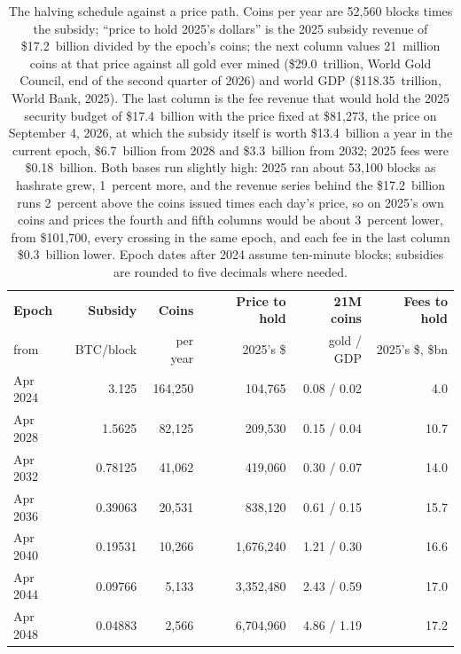\begin{table}[htb]
  \centering
  \scriptsize
  \setlength{\tabcolsep}{2pt}
  \begin{tabular}{lrrrrr}
    \hline
    \textbf{Epoch} & \textbf{Subsidy} & \textbf{Coins} & \textbf{Price to hold} & \textbf{21M coins} & \textbf{Fees to hold} \\
    from & BTC/block & per year & 2025's \$ & gold / GDP & 2025's \$, \$bn \\
    \hline
    Apr 2024 & 3.125 & 164,250 & 104,765 & 0.08 / 0.02 & 4.0 \\
    Apr 2028 & 1.5625 & 82,125 & 209,530 & 0.15 / 0.04 & 10.7 \\
    Apr 2032 & 0.78125 & 41,062 & 419,060 & 0.30 / 0.07 & 14.0 \\
    Apr 2036 & 0.39063 & 20,531 & 838,120 & 0.61 / 0.15 & 15.7 \\
    Apr 2040 & 0.19531 & 10,266 & 1,676,240 & 1.21 / 0.30 & 16.6 \\
    Apr 2044 & 0.09766 & 5,133 & 3,352,480 & 2.43 / 0.59 & 17.0 \\
    Apr 2048 & 0.04883 & 2,566 & 6,704,960 & 4.86 / 1.19 & 17.2 \\
    \hline
  \end{tabular}
  \caption{The halving schedule against a price path. Coins per year are 52,560 blocks times the subsidy; ``price to hold 2025's dollars'' is the 2025 subsidy revenue of \$17.2~billion divided by the epoch's coins; the next column values 21~million coins at that price against all gold ever mined (\$29.0~trillion, World Gold Council, end of the second quarter of 2026) and world GDP (\$118.35~trillion, World Bank, 2025). The last column is the fee revenue that would hold the 2025 security budget of \$17.4~billion with the price fixed at \$81,273, the price on September 4, 2026, at which the subsidy itself is worth \$13.4~billion a year in the current epoch, \$6.7~billion from 2028 and \$3.3~billion from 2032; 2025 fees were \$0.18~billion. Both bases run slightly high: 2025 ran about 53,100 blocks as hashrate grew, 1~percent more, and the revenue series behind the \$17.2~billion runs 2~percent above the coins issued times each day's price, so on 2025's own coins and prices the fourth and fifth columns would be about 3~percent lower, from \$101,700, every crossing in the same epoch, and each fee in the last column \$0.3~billion lower. Epoch dates after 2024 assume ten-minute blocks; subsidies are rounded to five decimals where needed.} %
  \label{tab:outlook-halving}
\end{table}

